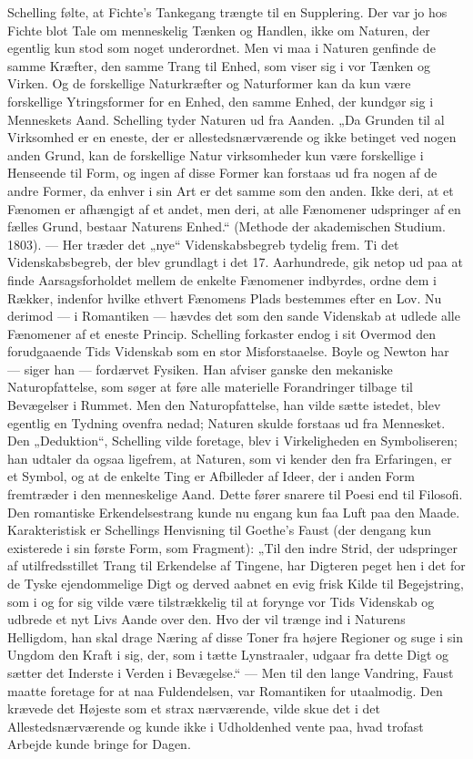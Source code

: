 \documentclass[12pt,a4paper,openany]{book}
\newcommand{\opage}[1]{\marginnote{\footnotesize\textit{[#1]}}}
\begin{document}
Schelling følte, at Fichte’s Tankegang trængte til en Supplering.
Der var jo hos Fichte blot Tale om menneskelig Tænken og Handlen,
ikke om Naturen, der egentlig kun stod som noget underordnet.
Men vi maa i Naturen genfinde de samme Kræfter, den samme
Trang til Enhed, som viser sig i vor Tænken og Virken. Og de forskellige
Naturkræfter og Naturformer kan da kun være forskellige
Ytringsformer for en Enhed, den samme Enhed, der kundgør sig i
Menneskets Aand. Schelling tyder Naturen ud fra Aanden. „Da
Grunden til al Virksomhed er en eneste, der er allestedsnærværende
og ikke betinget ved nogen anden Grund, kan de forskellige Natur%
\opage{9}virksomheder kun være forskellige i Henseende til Form, og ingen
af disse Former kan forstaas ud fra nogen af de andre Former,
da enhver i sin Art er det samme som den anden. Ikke deri,
at et Fænomen er afhængigt af et andet, men deri, at alle Fænomener
udspringer af en fælles Grund, bestaar Naturens Enhed.“ (Methode
der akademischen Studium. 1803). --- Her træder det „nye“
Videnskabsbegreb tydelig frem. Ti det Videnskabsbegreb, der blev
grundlagt i det 17. Aarhundrede, gik netop ud paa at finde Aarsagsforholdet
mellem de enkelte Fænomener indbyrdes, ordne dem i
Rækker, indenfor hvilke ethvert Fænomens Plads bestemmes efter
en Lov. Nu derimod --- i Romantiken --- hævdes det som den sande
Videnskab at udlede alle Fænomener af et eneste Princip. Schelling
forkaster endog i sit Overmod den forudgaaende Tids Videnskab
som en stor Misforstaaelse. Boyle og Newton har --- siger han
--- fordærvet Fysiken. Han afviser ganske den mekaniske Naturopfattelse,
som søger at føre alle materielle Forandringer tilbage til Bevægelser
i Rummet. Men den Naturopfattelse, han vilde sætte istedet,
blev egentlig en Tydning ovenfra nedad; Naturen skulde forstaas
ud fra Mennesket. Den „Deduktion“, Schelling vilde foretage, blev i
Virkeligheden en Symboliseren; han udtaler da ogsaa ligefrem, at
Naturen, som vi kender den fra Erfaringen, er et Symbol, og at de
enkelte Ting er Afbilleder af Ideer, der i anden Form fremtræder i
den menneskelige Aand. Dette fører snarere til Poesi end til Filosofi.
Den romantiske Erkendelsestrang kunde nu engang kun faa Luft
paa den Maade. Karakteristisk er Schellings Henvisning til Goethe’s
Faust (der dengang kun existerede i sin første Form, som Fragment):
„Til den indre Strid, der udspringer af utilfredsstillet Trang
til Erkendelse af Tingene, har Digteren peget hen i det for de Tyske
ejendommelige Digt og derved aabnet en evig frisk Kilde til Begejstring,
som i og for sig vilde være tilstrækkelig til at forynge vor
Tids Videnskab og udbrede et nyt Livs Aande over den. Hvo der vil
trænge ind i Naturens Helligdom, han skal drage Næring af disse
Toner fra højere Regioner og suge i sin Ungdom den Kraft i sig,
der, som i tætte Lynstraaler, udgaar fra dette Digt og sætter det
Inderste i Verden i Bevægelse.“ --- Men til den lange Vandring, Faust
maatte foretage for at naa Fuldendelsen, var Romantiken for utaalmodig.
Den krævede det Højeste som et strax nærværende, vilde
skue det i det Allestedsnærværende og kunde ikke i Udholdenhed
vente paa, hvad trofast Arbejde kunde bringe for Dagen.
\end{document}
